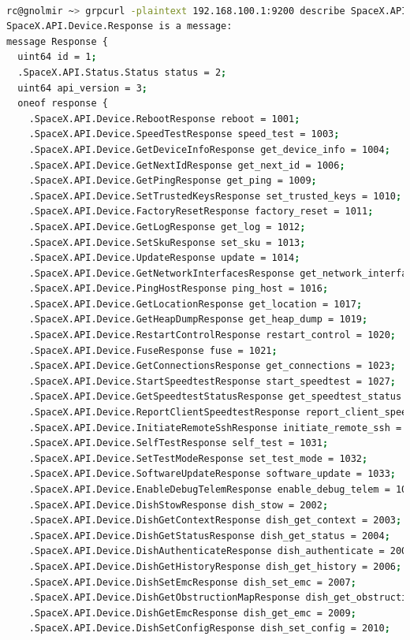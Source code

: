 \documentclass[IN,11pt,twoside,openright,bachelor,english]{tumthesis}
\begin{document}
\begin{lstlisting}[language=bash,basicstyle=\tiny]

rc@gnolmir ~> grpcurl -plaintext 192.168.100.1:9200 describe SpaceX.API.Device.Response
SpaceX.API.Device.Response is a message:
message Response {
  uint64 id = 1;
  .SpaceX.API.Status.Status status = 2;
  uint64 api_version = 3;
  oneof response {
    .SpaceX.API.Device.RebootResponse reboot = 1001;
    .SpaceX.API.Device.SpeedTestResponse speed_test = 1003;
    .SpaceX.API.Device.GetDeviceInfoResponse get_device_info = 1004;
    .SpaceX.API.Device.GetNextIdResponse get_next_id = 1006;
    .SpaceX.API.Device.GetPingResponse get_ping = 1009;
    .SpaceX.API.Device.SetTrustedKeysResponse set_trusted_keys = 1010;
    .SpaceX.API.Device.FactoryResetResponse factory_reset = 1011;
    .SpaceX.API.Device.GetLogResponse get_log = 1012;
    .SpaceX.API.Device.SetSkuResponse set_sku = 1013;
    .SpaceX.API.Device.UpdateResponse update = 1014;
    .SpaceX.API.Device.GetNetworkInterfacesResponse get_network_interfaces = 1015;
    .SpaceX.API.Device.PingHostResponse ping_host = 1016;
    .SpaceX.API.Device.GetLocationResponse get_location = 1017;
    .SpaceX.API.Device.GetHeapDumpResponse get_heap_dump = 1019;
    .SpaceX.API.Device.RestartControlResponse restart_control = 1020;
    .SpaceX.API.Device.FuseResponse fuse = 1021;
    .SpaceX.API.Device.GetConnectionsResponse get_connections = 1023;
    .SpaceX.API.Device.StartSpeedtestResponse start_speedtest = 1027;
    .SpaceX.API.Device.GetSpeedtestStatusResponse get_speedtest_status = 1028;
    .SpaceX.API.Device.ReportClientSpeedtestResponse report_client_speedtest = 1029;
    .SpaceX.API.Device.InitiateRemoteSshResponse initiate_remote_ssh = 1030 [deprecated = true];
    .SpaceX.API.Device.SelfTestResponse self_test = 1031;
    .SpaceX.API.Device.SetTestModeResponse set_test_mode = 1032;
    .SpaceX.API.Device.SoftwareUpdateResponse software_update = 1033;
    .SpaceX.API.Device.EnableDebugTelemResponse enable_debug_telem = 1034;
    .SpaceX.API.Device.DishStowResponse dish_stow = 2002;
    .SpaceX.API.Device.DishGetContextResponse dish_get_context = 2003;
    .SpaceX.API.Device.DishGetStatusResponse dish_get_status = 2004;
    .SpaceX.API.Device.DishAuthenticateResponse dish_authenticate = 2005;
    .SpaceX.API.Device.DishGetHistoryResponse dish_get_history = 2006;
    .SpaceX.API.Device.DishSetEmcResponse dish_set_emc = 2007;
    .SpaceX.API.Device.DishGetObstructionMapResponse dish_get_obstruction_map = 2008;
    .SpaceX.API.Device.DishGetEmcResponse dish_get_emc = 2009;
    .SpaceX.API.Device.DishSetConfigResponse dish_set_config = 2010;

\end{lstlisting}
\end{document}
